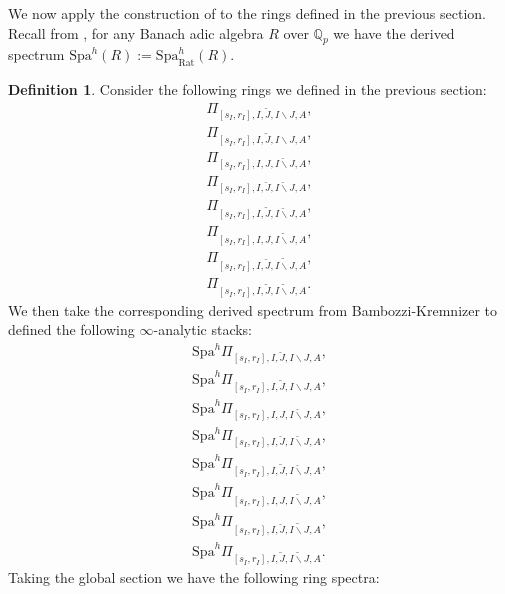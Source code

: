 \documentclass[12pt]{amsart}
\theoremstyle{definition}
\newtheorem{definition}[theorem]{Definition}
\numberwithin{equation}{section}
\begin{document}
\indent We now apply the construction of \cite{BK} to the rings defined in the previous section. Recall from \cite{BK}, for any Banach adic algebra $R$ over $\mathbb{Q}_p$ we have the derived spectrum $\mathrm{Spa}^h(R):=\mathrm{Spa}^h_{\mathrm{Rat}}(R)$. 




\begin{definition}
Consider the following rings we defined in the previous section:
\begin{align}
\Pi_{[s_I,r_I],I,\breve{J},I\backslash J,A},\\	
\Pi_{[s_I,r_I],I,\widetilde{J},I\backslash J,A},\\
\Pi_{[s_I,r_I],I,J,\breve{I\backslash J},A},\\	
\Pi_{[s_I,r_I],I,\breve{J},\breve{I\backslash J},A},\\	
\Pi_{[s_I,r_I],I,\widetilde{J},\breve{I\backslash J},A},\\
\Pi_{[s_I,r_I],I,J,\widetilde{I\backslash J},A},\\	
\Pi_{[s_I,r_I],I,\breve{J},\widetilde{I\backslash J},A},\\	
\Pi_{[s_I,r_I],I,\widetilde{J},\widetilde{I\backslash J},A}.	
\end{align}
We then take the corresponding derived spectrum from Bambozzi-Kremnizer to defined the following $\infty$-analytic stacks:
\begin{align}
\mathrm{Spa}^h\Pi_{[s_I,r_I],I,\breve{J},I\backslash J,A},\\	
\mathrm{Spa}^h\Pi_{[s_I,r_I],I,\widetilde{J},I\backslash J,A},\\
\mathrm{Spa}^h\Pi_{[s_I,r_I],I,J,\breve{I\backslash J},A},\\	
\mathrm{Spa}^h\Pi_{[s_I,r_I],I,\breve{J},\breve{I\backslash J},A},\\	
\mathrm{Spa}^h\Pi_{[s_I,r_I],I,\widetilde{J},\breve{I\backslash J},A},\\
\mathrm{Spa}^h\Pi_{[s_I,r_I],I,J,\widetilde{I\backslash J},A},\\	
\mathrm{Spa}^h\Pi_{[s_I,r_I],I,\breve{J},\widetilde{I\backslash J},A},\\	
\mathrm{Spa}^h\Pi_{[s_I,r_I],I,\widetilde{J},\widetilde{I\backslash J},A}.	
\end{align}
Taking the global section we have the following ring spectra:
\begin{align}

\end{align}
\end{definition}
\end{document}
